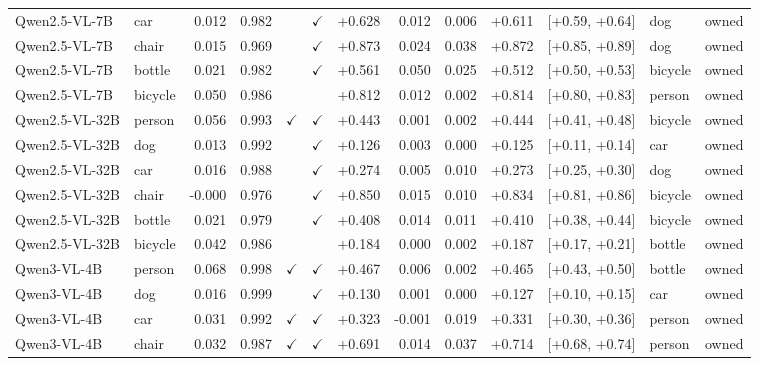 \begin{longtable}{llrrccrrrrrll}
\rowcolor{cfSlate2}Qwen2.5-VL-7B & car & 0.012 & 0.982 &  & $\checkmark$ & +0.628 & 0.012 & 0.006 & +0.611 & [+0.59, +0.64] & dog & owned \\
\rowcolor{cfSlate2}Qwen2.5-VL-7B & chair & 0.015 & 0.969 &  & $\checkmark$ & +0.873 & 0.024 & 0.038 & +0.872 & [+0.85, +0.89] & dog & owned \\
\rowcolor{cfSlate2}Qwen2.5-VL-7B & bottle & 0.021 & 0.982 &  & $\checkmark$ & +0.561 & 0.050 & 0.025 & +0.512 & [+0.50, +0.53] & bicycle & owned \\
\rowcolor{cfSlate2}Qwen2.5-VL-7B & bicycle & 0.050 & 0.986 &  &  & +0.812 & 0.012 & 0.002 & +0.814 & [+0.80, +0.83] & person & owned \\
\rowcolor{cfSlate2}Qwen2.5-VL-32B & person & 0.056 & 0.993 & $\checkmark$ & $\checkmark$ & +0.443 & 0.001 & 0.002 & +0.444 & [+0.41, +0.48] & bicycle & owned \\
\rowcolor{cfSlate2}Qwen2.5-VL-32B & dog & 0.013 & 0.992 &  & $\checkmark$ & +0.126 & 0.003 & 0.000 & +0.125 & [+0.11, +0.14] & car & owned \\
\rowcolor{cfSlate2}Qwen2.5-VL-32B & car & 0.016 & 0.988 &  & $\checkmark$ & +0.274 & 0.005 & 0.010 & +0.273 & [+0.25, +0.30] & dog & owned \\
\rowcolor{cfSlate2}Qwen2.5-VL-32B & chair & -0.000 & 0.976 &  & $\checkmark$ & +0.850 & 0.015 & 0.010 & +0.834 & [+0.81, +0.86] & bicycle & owned \\
\rowcolor{cfSlate2}Qwen2.5-VL-32B & bottle & 0.021 & 0.979 &  & $\checkmark$ & +0.408 & 0.014 & 0.011 & +0.410 & [+0.38, +0.44] & bicycle & owned \\
\rowcolor{cfSlate2}Qwen2.5-VL-32B & bicycle & 0.042 & 0.986 &  &  & +0.184 & 0.000 & 0.002 & +0.187 & [+0.17, +0.21] & bottle & owned \\
\rowcolor{cfSlate2}Qwen3-VL-4B & person & 0.068 & 0.998 & $\checkmark$ & $\checkmark$ & +0.467 & 0.006 & 0.002 & +0.465 & [+0.43, +0.50] & bottle & owned \\
\rowcolor{cfSlate2}Qwen3-VL-4B & dog & 0.016 & 0.999 &  & $\checkmark$ & +0.130 & 0.001 & 0.000 & +0.127 & [+0.10, +0.15] & car & owned \\
\rowcolor{cfSlate2}Qwen3-VL-4B & car & 0.031 & 0.992 & $\checkmark$ & $\checkmark$ & +0.323 & -0.001 & 0.019 & +0.331 & [+0.30, +0.36] & person & owned \\
\rowcolor{cfSlate2}Qwen3-VL-4B & chair & 0.032 & 0.987 & $\checkmark$ & $\checkmark$ & +0.691 & 0.014 & 0.037 & +0.714 & [+0.68, +0.74] & person & owned \\

\end{longtable}
